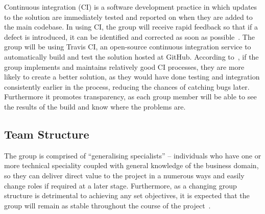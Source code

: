 Continuous integration (CI) is a software development practice in which updates to the solution are immediately tested and reported on when they are added to the main codebase. In using CI, the group will receive rapid feedback so that if a defect is introduced, it can be identified and corrected as soon as possible~\parencite{web:behaviour_driven_development}. The group will be using Travis CI, an open-source continuous integration service to automatically build and test the solution hosted at GitHub. According to~\cite{book:ci_NET}, if the group implements and maintains relatively good CI processes, they are more likely to create a better solution, as they would have done testing and integration consistently earlier in the process, reducing the chances of catching bugs later. Furthermore it promotes transparency, as each group member will be able to see the results of the build and know where the problems are.

\subsection{Team Structure}

The group is comprised of ``generalising specialists'' -- individuals who have one or more technical speciality coupled with general knowledge of the business domain, so they can deliver direct value to the project in a numerous ways and easily change roles if required at a later stage. Furthermore, as a changing group structure is detrimental to achieving any set objectives, it is expected that the group will remain as stable throughout the course of the project~\parencite{book:agile_development}.

